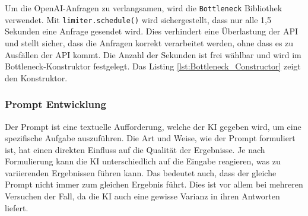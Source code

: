 
Um die OpenAI-Anfragen zu verlangsamen, wird die \texttt{Bottleneck} Bibliothek verwendet. Mit \texttt{limiter.schedule()} wird sichergestellt, dass nur alle 1,5 Sekunden eine Anfrage gesendet wird. Dies verhindert eine Überlastung der \ac{API} und stellt sicher, dass die Anfragen korrekt verarbeitet werden, ohne dass es zu Ausfällen der \ac{API} kommt. Die Anzahl der Sekunden ist frei wählbar und wird im Bottleneck-Konstruktor festgelegt. Das Listing \ref{lst:Bottleneck_Constructor} zeigt den Konstruktor.


\subsubsection{Prompt Entwicklung}
Der Prompt ist eine textuelle Aufforderung, welche der \ac{KI} gegeben wird, um eine spezifische Aufgabe auszuführen. Die Art und Weise, wie der Prompt formuliert ist, hat einen direkten Einfluss auf die Qualität der Ergebnisse. Je nach Formulierung kann die \ac{KI} unterschiedlich auf die Eingabe reagieren, was zu variierenden Ergebnissen führen kann. Das bedeutet auch, dass der gleiche Prompt nicht immer zum gleichen Ergebnis führt. Dies ist vor allem bei mehreren Versuchen der Fall, da die \ac{KI} auch eine gewisse Varianz in ihren Antworten liefert.  \cite{white2023promptpatterncatalogenhance}

